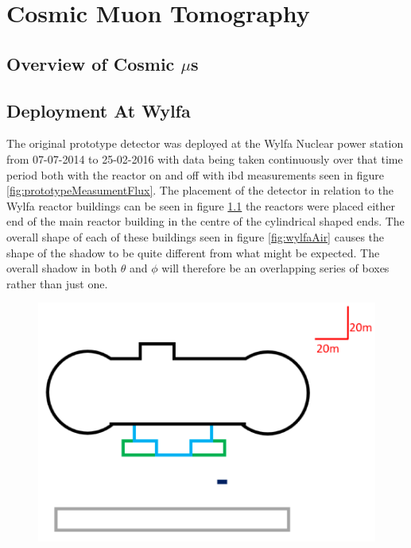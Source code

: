 
\chapter{Cosmic Muon Tomography}

\ifpdf
    \graphicspath{{Chapter5/Figs/Raster/}{Chapter5/Figs/PDF/}{Chapter5/Figs/}}
\else
    \graphicspath{{Chapter5/Figs/Vector/}{Chapter5/Figs/}}
\fi

\section{Overview of Cosmic $\mu$s}


\section{Deployment At Wylfa}\label{sec:deploymentAtWylfa}
The original prototype detector was deployed at the Wylfa Nuclear power station from 07-07-2014 to 25-02-2016 with data being taken continuously over that time period both with the reactor on and off with ibd measurements seen in figure \ref{fig:prototypeMeasumentFlux}. The placement of the detector in relation to the Wylfa reactor buildings can be seen in figure \ref{fig:wylfaTrace} the reactors were placed either end of the main reactor building in the centre of the cylindrical shaped ends. The overall shape of each of these buildings seen in figure \ref{fig:wylfaAir} causes the shape of the shadow to be quite different from what might be expected. The overall shadow in both $\theta$ and $\phi$ will therefore be an overlapping series of boxes rather than just one.   
 
\begin{figure}[H]
 \centering
 \includegraphics[width=0.7\linewidth]{Chapter5/Figs/Raster/wylfaTrace.png}
 \label{fig:wylfaTrace}
\end{figure}

